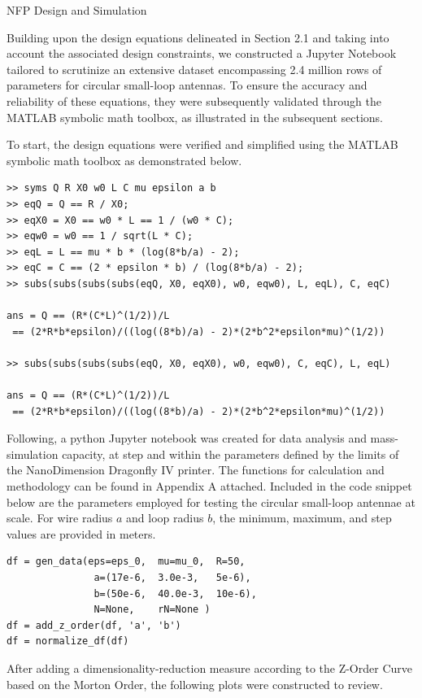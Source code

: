 \documentclass[12pt]{article}
\begin{document}
\begin{section} {NFP Design and Simulation}

Building upon the design equations delineated in Section 2.1 and taking into account the associated design constraints, we constructed a Jupyter Notebook tailored to scrutinize an extensive dataset encompassing 2.4 million rows of parameters for circular small-loop antennas. To ensure the accuracy and reliability of these equations, they were subsequently validated through the MATLAB symbolic math toolbox, as illustrated in the subsequent sections.

To start, the design equations were verified and simplified using the MATLAB symbolic math toolbox as demonstrated below.

\begin{verbatim}
>> syms Q R X0 w0 L C mu epsilon a b
>> eqQ = Q == R / X0;
>> eqX0 = X0 == w0 * L == 1 / (w0 * C);
>> eqw0 = w0 == 1 / sqrt(L * C);
>> eqL = L == mu * b * (log(8*b/a) - 2);
>> eqC = C == (2 * epsilon * b) / (log(8*b/a) - 2);
>> subs(subs(subs(subs(eqQ, X0, eqX0), w0, eqw0), L, eqL), C, eqC)

ans = Q == (R*(C*L)^(1/2))/L 
 == (2*R*b*epsilon)/((log((8*b)/a) - 2)*(2*b^2*epsilon*mu)^(1/2))

>> subs(subs(subs(subs(eqQ, X0, eqX0), w0, eqw0), C, eqC), L, eqL)

ans = Q == (R*(C*L)^(1/2))/L 
 == (2*R*b*epsilon)/((log((8*b)/a) - 2)*(2*b^2*epsilon*mu)^(1/2))
\end{verbatim}

Following, a python Jupyter notebook was created for data analysis and mass-simulation capacity, at step and within the parameters defined by the limits of the NanoDimension Dragonfly IV printer. The functions for calculation and methodology can be found in Appendix A attached. Included in the code snippet below are the parameters employed for testing the circular small-loop antennae at scale.  For wire radius $a$ and loop radius $b$, the minimum, maximum, and step values are provided in meters.

\begin{verbatim}
df = gen_data(eps=eps_0,  mu=mu_0,  R=50,
               a=(17e-6,  3.0e-3,   5e-6),
               b=(50e-6,  40.0e-3,  10e-6),
               N=None,    rN=None )
df = add_z_order(df, 'a', 'b')
df = normalize_df(df)
\end{verbatim}

After adding a dimensionality-reduction measure according to the Z-Order Curve based on the Morton Order, the following plots were constructed to review.


\end{section}
\end{document}
